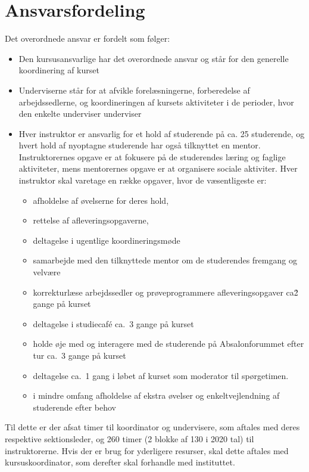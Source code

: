 \documentclass[a4paper]{article}
\begin{document}
\section{Ansvarsfordeling}
Det overordnede ansvar er fordelt som følger:
\begin{itemize}
\item Den kursusansvarlige har det overordnede ansvar og står for den
  generelle koordinering af kurset
\item Underviserne står for at afvikle forelæsningerne, forberedelse
  af arbejdssedlerne, og koordineringen af kursets aktiviteter i de
  perioder, hvor den enkelte underviser underviser
\item Hver instruktor er ansvarlig for et hold af studerende på ca. 25
  studerende, og hvert hold af nyoptagne studerende har også
  tilknyttet en mentor. Instruktorernes opgave er at fokusere på de
  studerendes læring og faglige aktiviteter, mens mentorernes opgave
  er at organisere sociale aktiviter. Hver instruktor skal varetage en
  række opgaver, hvor de væsentligeste er:
  \begin{itemize}
  \item afholdelse af øvelserne for deres hold,
  \item rettelse af afleveringsopgaverne,
  \item deltagelse i ugentlige koordineringsmøde
  \item samarbejde med den tilknyttede mentor om de studerendes
    fremgang og velvære
  \item korrekturlæse arbejdssedler og prøveprogrammere
    afleveringsopgaver ca\. 2 gange på kurset
  \item deltagelse i studiecaf{\'e} ca.\ 3 gange på kurset
  \item holde øje med og interagere med de studerende på
    Absalonforummet efter tur ca.\ 3 gange på kurset
  \item deltagelse ca.\ 1 gang i løbet af kurset som moderator til spørgetimen.
  \item i mindre omfang afholdelse af ekstra øvelser og enkeltvejlendning af
    studerende efter behov
  \end{itemize}
\end{itemize}
Til dette er der afsat timer til koordinator og undervisere, som
aftales med deres respektive sektionsleder, og 260 timer (2 blokke af
130 i 2020 tal) til instruktorerne. Hvis der er brug for yderligere
resurser, skal dette aftales med kursuskoordinator, som derefter skal
forhandle med instituttet.
\end{document}
